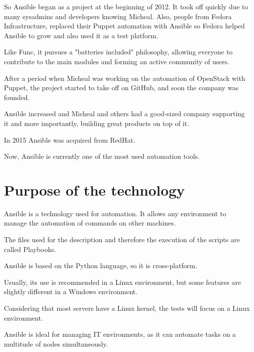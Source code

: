 \documentclass[12pt,a4paper,openright,twoside]{book}
\begin{document}
So Ansible began as a project at the beginning of 2012. It took off quickly due to many sysadmins and developers knowing Micheal.
Also, people from Fedora Infrastructure, replaced their Puppet automation with Ansible so Fedora helped Ansible to grow and also used it as a test platform.


Like Func, it pursues a "batteries included" philosophy, allowing everyone to contribute to the main modules and forming an active community of users.


After a period when Micheal was working on the automation of OpenStack with Puppet, the project started to take off on GitHub, and soon the company was founded.


Ansible increased and Micheal and others had a good-sized company supporting it and more importantly, building great products on top of it.


In 2015 Ansible was acquired from RedHat\cite{ansibleRedHat}.


Now, Ansible is currently one of the most used automation tools.

\section{Purpose of the technology}
Ansible is a technology used for automation. It allows any environment to manage the automation of commands on other machines.


The files used for the description and therefore the execution of the scripts are called Playbooks.


Ansible is based on the Python language, so it is cross-platform.


Usually, its use is recommended in a Linux environment, but some features are slightly different in a Windows environment.


Considering that most servers have a Linux kernel, the tests will focus on a Linux environment.


Ansible is ideal for managing IT environments, as it can automate tasks on a multitude of nodes simultaneously.
\end{document}
